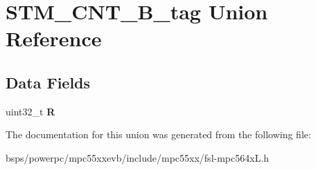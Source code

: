 \hypertarget{unionSTM__CNT__32B__tag}{}\section{S\+T\+M\+\_\+\+C\+N\+T\+\_\+B\+\_\+tag Union Reference}
\label{unionSTM__CNT__32B__tag}
\subsection*{Data Fields}
\begin{DoxyCompactItemize}
\item 
\mbox{\label{unionSTM__CNT__32B__tag_ac3dce183bf69c4eec8074b0ad9da5ae1}} 
uint32\+\_\+t {\bfseries R}
\end{DoxyCompactItemize}


The documentation for this union was generated from the following file\+:\begin{DoxyCompactItemize}
\item 
bsps/powerpc/mpc55xxevb/include/mpc55xx/fsl-\/mpc564x\+L.\+h\end{DoxyCompactItemize}
